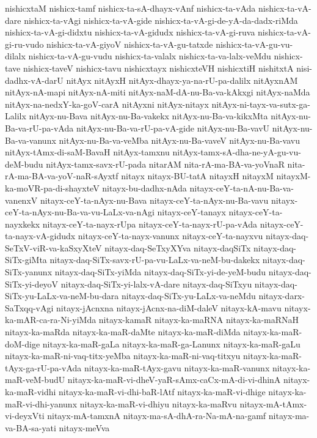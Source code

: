 {nishicxtaM
nishicx-tamf
nishicx-ta-sA-dhayx-vAnf
nishicx-ta-vAda
nishicx-ta-vA-dare
nishicx-ta-vAgi
nishicx-ta-vA-gide
nishicx-ta-vA-gi-de-yA-da-dadx-riMda
nishicx-ta-vA-gi-didxtu
nishicx-ta-vA-gidudx
nishicx-ta-vA-gi-ruva
nishicx-ta-vA-gi-ru-vudo
nishicx-ta-vA-giyoV
nishicx-ta-vA-gu-tatxde
nishicx-ta-vA-gu-vu-dilalx
nishicx-ta-vA-gu-vudu
nishicx-ta-valalx
nishicx-ta-va-lalx-veMdu
nishicx-tave
nishicx-taveV
nishicx-tavu
nishicxtayx
nishicxteVH
nishicxtiH
nishitxtA
nisi-dadhx-vA-darU
nitAyx
nitAyxH
nitAyx-dhayx-ya-na-rU-pa-dalilx
nitAyxnAM
nitAyx-nA-mapi
nitAyx-nA-miti
nitAyx-naM-dA-nu-Ba-va-kAkxgi
nitAyx-naMda
nitAyx-na-nedxY-ka-goV-carA
nitAyxni
nitAyx-nitayx
nitAyx-ni-tayx-va-sutx-ga-Lalilx
nitAyx-nu-Bava
nitAyx-nu-Ba-vakekx
nitAyx-nu-Ba-va-kikxMta
nitAyx-nu-Ba-va-rU-pa-vAda
nitAyx-nu-Ba-va-rU-pa-vA-gide
nitAyx-nu-Ba-vavU
nitAyx-nu-Ba-va-vanunx
nitAyx-nu-Ba-va-veMba
nitAyx-nu-Ba-vaveV
nitAyx-nu-Ba-vavu
nitAyx-tAmx-di-saM-BavaH
nitAyx-tamxnu
nitAyx-tamx-sA-dha-ne-yA-gu-vu-deM-budu
nitAyx-tamx-savx-rU-pada
nitarAM
nita-rA-ma-BA-va-yoVnaR
nita-rA-ma-BA-va-yoV-naR-sAyxtf
nitayx
nitayx-BU-tatA
nitayxH
nitayxM
nitayxM-ka-moVR-pa-di-shayxteV
nitayx-bu-dadhx-nAda
nitayx-ceY-ta-nA-nu-Ba-va-vanenxV
nitayx-ceY-ta-nAyx-nu-Bava
nitayx-ceY-ta-nAyx-nu-Ba-vavu
nitayx-ceY-ta-nAyx-nu-Ba-va-vu-LaLx-va-nAgi
nitayx-ceY-tanayx
nitayx-ceY-ta-nayxkekx
nitayx-ceY-ta-nayx-rUpa
nitayx-ceY-ta-nayx-rU-pa-vAda
nitayx-ceY-ta-nayx-vA-gidudx
nitayx-ceY-ta-nayx-vanunx
nitayx-ceY-ta-nayxvu
nitayx-daq-SeTxV-viR-va-kaSxyXteV
nitayx-daq-SeTxyXYva
nitayx-daqSiTx
nitayx-daq-SiTx-giMta
nitayx-daq-SiTx-savx-rU-pa-vu-LaLx-va-neM-bu-dakekx
nitayx-daq-SiTx-yanunx
nitayx-daq-SiTx-yiMda
nitayx-daq-SiTx-yi-de-yeM-budu
nitayx-daq-SiTx-yi-deyoV
nitayx-daq-SiTx-yi-lalx-vA-dare
nitayx-daq-SiTxyu
nitayx-daq-SiTx-yu-LaLx-va-neM-bu-dara
nitayx-daq-SiTx-yu-LaLx-va-neMdu
nitayx-darx-SaTxqq-vAgi
nitayx-jAcnxna
nitayx-jAcnx-na-diM-daleV
nitayx-kA-mavu
nitayx-ka-mAR-ca-ra-Ni-yiMda
nitayx-kamaR
nitayx-ka-maRNA
nitayx-ka-maRNaH
nitayx-ka-maRda
nitayx-ka-maR-daMte
nitayx-ka-maR-diMda
nitayx-ka-maR-doM-dige
nitayx-ka-maR-gaLa
nitayx-ka-maR-ga-Lanunx
nitayx-ka-maR-gaLu
nitayx-ka-maR-ni-vaq-titx-yeMba
nitayx-ka-maR-ni-vaq-titxyu
nitayx-ka-maR-tAyx-ga-rU-pa-vAda
nitayx-ka-maR-tAyx-gavu
nitayx-ka-maR-vanunx
nitayx-ka-maR-veM-budU
nitayx-ka-maR-vi-dheV-yaR-sAmx-caCx-mA-di-vi-dhinA
nitayx-ka-maR-vidhi
nitayx-ka-maR-vi-dhi-baR-lAtf
nitayx-ka-maR-vi-dhige
nitayx-ka-maR-vi-dhi-yanunx
nitayx-ka-maR-vi-dhiyu
nitayx-ka-maRvu
nitayx-mA-tAmx-vi-deyxVti
nitayx-mA-tamxnA
nitayx-ma-sA-dhA-ra-Na-mA-na-gamf
nitayx-ma-va-BA-sa-yati
nitayx-meVva
}
